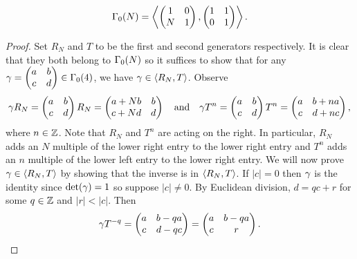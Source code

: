 \documentclass[12pt,oneside]{book}
\begin{document}
      \begin{proposition}\label{prop:Hecke_congruence_generator}
        \[
          \Gamma_{0}(N) = \left\langle\begin{pmatrix} 1 & 0 \\ N & 1 \end{pmatrix},\begin{pmatrix} 1 & 1 \\ 0 & 1 \end{pmatrix}\right\rangle.
        \]
      \end{proposition}
      \begin{proof}
        Set $R_{N}$ and $T$ to be the first and second generators respectively. It is clear that they both belong to $\Gamma_{0}(N)$ so it suffices to show that for any $\gamma = \begin{pmatrix} a & b \\ c & d \end{pmatrix} \in \Gamma_{0}(4)$, we have $\gamma \in \langle R_{N},T\rangle$. Observe
        \[
          \gamma R_{N} = \begin{pmatrix} a & b \\ c & d \end{pmatrix}R_{N} = \begin{pmatrix} a+Nb & b \\ c+Nd & d \end{pmatrix} \quad \text{and} \quad \gamma T^{n} = \begin{pmatrix} a & b \\ c & d \end{pmatrix}T^{n} = \begin{pmatrix} a & b+na \\ c & d+nc \end{pmatrix},
        \]
        where $n \in \mathbb{Z}$. Note that $R_{N}$ and $T^{n}$ are acting on the right. In particular, $R_{N}$ adds an $N$ multiple of the lower right entry to the lower right entry and $T^{n}$ adds an $n$ multiple of the lower left entry to the lower right entry. We will now prove $\gamma \in \langle R_{N},T\rangle$ by showing that the inverse is in $\langle R_{N},T\rangle$. If $|c| = 0$ then $\gamma$ is the identity since $\det(\gamma) = 1$ so suppose $|c| \neq 0$. By Euclidean division, $d = qc+r$ for some $q \in \mathbb{Z}$ and $|r| < |c|$. Then
        \[
          \gamma T^{-q} = \begin{pmatrix} a & b-qa \\ c & d-qc \end{pmatrix} = \begin{pmatrix} a & b-qa \\ c & r \end{pmatrix}.
\]
\end{proof}
\end{document}
